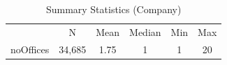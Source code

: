 \begin{table}[htbp]\centering
\def\sym#1{\ifmmode^{#1}\else\(^{#1}\)\fi}
\caption{Summary Statistics (Company)}
\begin{tabular}{l*{1}{ccccc}}
\toprule
                    &           N&        Mean&      Median&         Min&         Max\\
\label{tab:company}
noOffices           &      34,685&        1.75&           1&           1&          20\\
\bottomrule
\end{tabular}
\end{table}
